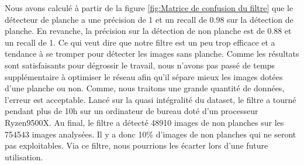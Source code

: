 Nous avons calculé à partir de la figure \ref{fig:Matrice de confusion du filtre} que le détecteur de planche a une précision de 1 et un recall de 0.98 sur la détection de planche. En revanche, la précision sur la détection de non planche est de 0.88 et un recall de 1. Ce qui veut dire que notre filtre est un peu trop efficace et a tendance à se tromper pour détecter les images sans planche. Comme les résultats sont satisfaisants pour dégrossir le travail, nous n'avons pas passé de temps supplémentaire à optimiser le réseau afin qu'il sépare mieux les images dotées d'une planche ou non. Comme, nous traitons une grande quantité de données, l'erreur est acceptable. Lancé sur la quasi intégralité du dataset, le filtre a tourné pendant plus de 10h sur un ordinateur de bureau doté d'un processeur Ryzen9500X. Au final, le filtre a détecté 48910 images de non planches sur les 754543 images analysées. Il y a donc 10\% d'images de non planches qui ne seront pas exploitables. Via ce filtre, nous pourrions les écarter lors d'une future utilisation.